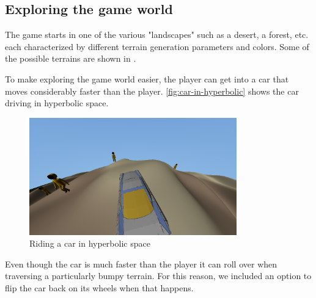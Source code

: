 \subsection{Exploring the game world}
The game starts in one of the various "landscapes" such as a desert, a forest, etc. each characterized by different terrain generation parameters and colors.
Some of the possible terrains are shown in .

To make exploring the game world easier, the player can get into a car that moves considerably faster than the player.
\autoref{fig:car-in-hyperbolic} shows the car driving in hyperbolic space.
\begin{figure}[h]
    \centering
    \includegraphics[width=0.8\textwidth]{chapters/results/sections/gameplay/resources/car-in-hyperbolic.png}
    \caption{Riding a car in hyperbolic space}
    \label{fig:car-in-hyperbolic}
\end{figure}
Even though the car is much faster than the player it can roll over when traversing a particularly bumpy terrain.
For this reason, we included an option to flip the car back on its wheels when that happens.